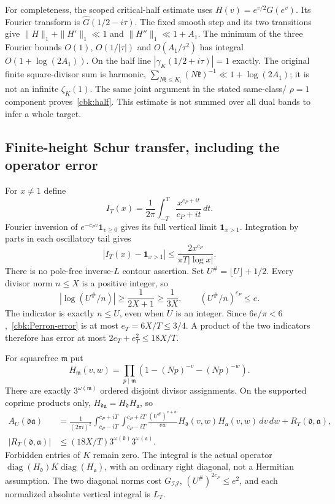 For completeness, the scoped critical-half estimate uses
$H(v)=e^{v/2}G(e^v)$. Its Fourier transform is
$\widehat G(1/2-i\tau)$. The fixed smooth step and its two
transitions give
$\|H\|_1+\|H'\|_1\ll1$ and $\|H''\|_1\ll1+A_1$.
The minimum of the three Fourier bounds
$O(1)$, $O(1/|\tau|)$ and $O(A_1/\tau^2)$ has integral
$O(1+\log(2A_1))$. On the half line
$|\gamma_K(1/2+i\tau)|=1$ exactly. The original finite square-divisor
sum is harmonic, $\sum_{N\mathfrak k\le K_{\mathfrak l}}
(N\mathfrak k)^{-1}\ll1+\log(2A_1)$; it is not an infinite
$\zeta_K(1)$. The same joint argument in the stated same-class/
$\rho=1$ component proves~\eqref{cbk:half}. This estimate is not
summed over all dual bands to infer a whole target.

\subsection{Finite-height Schur transfer, including the operator error}
\label{cbk:schur-proof}
For $x\ne1$ define
\[
 I_T(x)=\frac1{2\pi}\int_{-T}^T\frac{x^{c_P+it}}{c_P+it}\,dt.
\]
Fourier inversion of $e^{-c_Pv}\mathbf1_{v\ge0}$ gives its full
vertical limit $\mathbf1_{x>1}$. Integration by parts in each
oscillatory tail gives
\begin{equation}\label{cbk:Perron-error}
 |I_T(x)-\mathbf1_{x>1}|
                \le\frac{2x^{c_P}}{\pi T|\log x|}.
\end{equation}
There is no pole-free inverse-$L$ contour assertion. Set
$U^\#=\lfloor U\rfloor+1/2$. Every divisor norm $n\le X$ is a
positive integer, so
\[
 |\log(U^\#/n)|\ge\frac1{2X+1}\ge\frac1{3X},\qquad
 (U^\#/n)^{c_P}\le e.
\]
The indicator is exactly $n\le U$, even when $U$ is an integer.
Since $6e/\pi<6$,~\eqref{cbk:Perron-error} is at most
$e_T=6X/T\le3/4$. A product of the two indicators therefore has
error at most $2e_T+e_T^2\le18X/T$.

For squarefree $\mathfrak m$ put
\[
 H_{\mathfrak m}(v,w)=\prod_{p\mid\mathfrak m}
                              (1-(Np)^{-v}-(Np)^{-w}).
\]
There are exactly $3^{\omega(\mathfrak m)}$ ordered disjoint divisor
assignments. On the supported coprime products only,
$H_{\mathfrak d\mathfrak a}=H_{\mathfrak d}H_{\mathfrak a}$, so
\begin{equation}\label{cbk:finite-Perron}
 \begin{split}
 A_U(\mathfrak d\mathfrak a)
 &=\frac1{(2\pi i)^2}\int_{c_P-iT}^{c_P+iT}
                \int_{c_P-iT}^{c_P+iT}
       \frac{(U^\#)^{v+w}}{vw}
                 H_{\mathfrak d}(v,w)H_{\mathfrak a}(v,w)\,dv\,dw
                           +R_T(\mathfrak d,\mathfrak a),\\
 |R_T(\mathfrak d,\mathfrak a)|
 &\le(18X/T)3^{\omega(\mathfrak d)}3^{\omega(\mathfrak a)}.
 \end{split}
\end{equation}
Forbidden entries of $K$ remain zero. The integral is the actual
operator $\operatorname{diag}(H_{\mathfrak d})K
\operatorname{diag}(H_{\mathfrak a})$, with an ordinary right
diagonal, not a Hermitian assumption. The two diagonal norms cost
$G_{\mathcal I\mathcal J}$, $(U^\#)^{2c_P}\le e^2$, and each
normalized absolute vertical integral is $L_T$.

